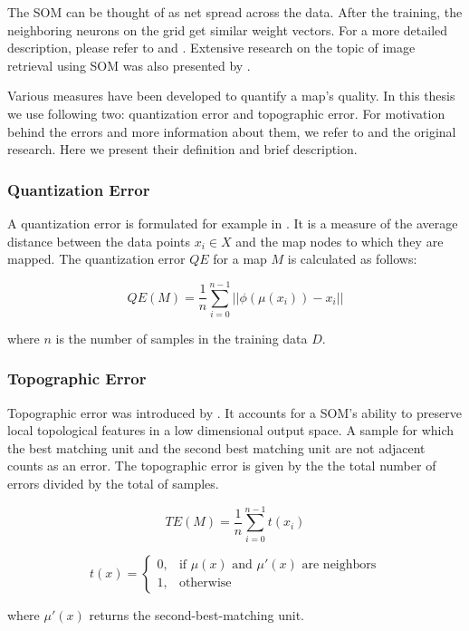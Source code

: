 The SOM can be thought of as net spread across the data. After the training, the neighboring neurons on the grid get similar weight vectors. For a more detailed description, please refer to \cite{kohonen1982self} and \cite{kohonen2007kohonen}. Extensive research on the topic of image retrieval using SOM was also presented by \cite{koskela2003interactive}.

Various measures have been developed to quantify a map's quality. In this thesis we use following two: quantization error and topographic error. For motivation behind the errors and more information about them, we refer to \cite{breard2017evaluating} and the original research. Here we present their definition and brief description.

\subsubsection*{Quantization Error}

A quantization error is formulated for example in \cite{wandeto2019quantization}. It is a measure of the average distance between the data points $x_i \in X$ and the map nodes to which they are mapped. The quantization error $QE$ for a map $M$ is calculated as follows:

$$
 QE(M) = \frac{1}{n}\sum_{i=0}^{n-1} ||\phi(\mu(x_i)) - x_i ||
$$

where $n$ is the number of samples in the training data $D$.

\subsubsection*{Topographic Error}

Topographic error was introduced by \cite{kiviluoto1996topology}. It accounts for a SOM's ability to preserve local topological features in a low dimensional output space. A sample for which the best matching unit and the second best matching unit are not adjacent counts as an error. The topographic error is given by the the total number of errors divided by the total of samples.

$$
    TE(M) = \frac{1}{n}\sum_{i=0}^{n-1}t(x_i)
$$

$$
    t(x) = \begin{cases}
			0, & \text{if $\mu(x)$ and $\mu'(x)$ are neighbors}\\
            1, & \text{otherwise}
		 \end{cases}
$$

where $\mu'(x)$ returns the second-best-matching unit.